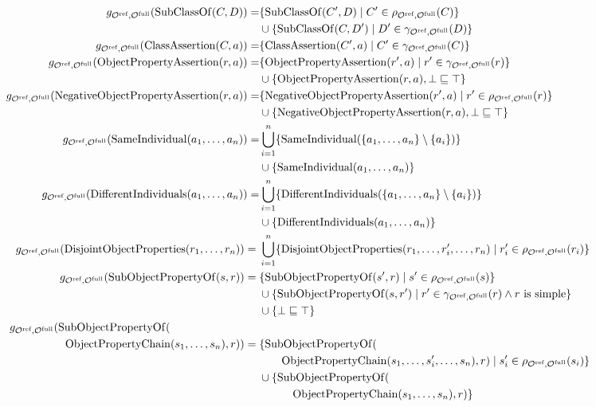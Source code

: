 \begin{widepage}
  \scriptsize
  \begin{align*}
    g_{\Omcref,\Omcfull}(\mathrm{SubClassOf}(C, D)) = & \{\mathrm{SubClassOf}(C', D) \mid C' \in \rho_{\Omcref,\Omcfull} (C)\} \\& \cup \{\mathrm{SubClassOf}(C, D') \mid D' \in \gamma_{\Omcref,\Omcfull} (D)\} \\
    g_{\Omcref,\Omcfull}(\mathrm{ClassAssertion}(C, a)) = & \{\mathrm{ClassAssertion}(C', a) \mid C' \in \gamma_{\Omcref,\Omcfull} (C)\} \\
    g_{\Omcref,\Omcfull}(\mathrm{ObjectPropertyAssertion}(r, a)) = & \{\mathrm{ObjectPropertyAssertion}(r', a) \mid r' \in \gamma_{\Omcref,\Omcfull} (r)\} \\& \cup \{ \mathrm{ObjectPropertyAssertion}(r, a), \bot \sqsubseteq \top \} \\
    g_{\Omcref,\Omcfull}(\mathrm{NegativeObjectPropertyAssertion}(r, a)) = & \{\mathrm{NegativeObjectPropertyAssertion}(r', a) \mid r' \in \rho_{\Omcref,\Omcfull} (r)\} \\& \cup \{\mathrm{NegativeObjectPropertyAssertion}(r, a), \bot \sqsubseteq \top \} \\
    g_{\Omcref,\Omcfull}(\mathrm{SameIndividual}(a_1, \dots, a_n)) = & \bigcup_{i=1}^n \{ \mathrm{SameIndividual}(\{a_1, \dots, a_n\} \setminus \{a_i\}) \} \\& \cup \{ \mathrm{SameIndividual}(a_1, \dots, a_n)\} \\
    g_{\Omcref,\Omcfull}(\mathrm{DifferentIndividuals}(a_1, \dots, a_n)) = & \bigcup_{i=1}^n \{ \mathrm{DifferentIndividuals}(\{a_1, \dots, a_n\} \setminus \{a_i\}) \} \\& \cup \{ \mathrm{DifferentIndividuals}(a_1, \dots, a_n)\} \\
    g_{\Omcref,\Omcfull}(\mathrm{DisjointObjectProperties}(r_1, \dots, r_n)) ={} & \bigcup_{i=1}^n \{ \mathrm{DisjointObjectProperties}(r_1, \dots, r_i', \dots, r_n) \mid r_i' \in \rho_{\Omcref,\Omcfull}(r_i) \} \\
    g_{\Omcref,\Omcfull}(\mathrm{SubObjectPropertyOf}(s, r)) ={} & \{\mathrm{SubObjectPropertyOf}(s', r) \mid s' \in \rho_{\Omcref,\Omcfull} (s)\} \\& \cup \{\mathrm{SubObjectPropertyOf}(s, r') \mid r' \in \gamma_{\Omcref,\Omcfull} (r) \land r \text{ is simple}\} \\& \cup \{ \bot \sqsubseteq \top \} \\
    g_{\Omcref,\Omcfull}(\mathrm{SubObjectPropertyOf}(\qquad \qquad \qquad \qquad & \\\mathrm{ObjectPropertyChain}(s_1, \dots, s_n), r)) ={} & \{\mathrm{SubObjectPropertyOf}( \\& \qquad \mathrm{ObjectPropertyChain}(s_1, \dots, s_i', \dots, s_n), r) \mid s_i' \in \rho_{\Omcref,\Omcfull} (s_i)\} \\& \cup \{\mathrm{SubObjectPropertyOf}( \\& \quad \qquad \mathrm{ObjectPropertyChain}(s_1, \dots, s_n), r)\} \\

\end{align*}
\end{widepage}
